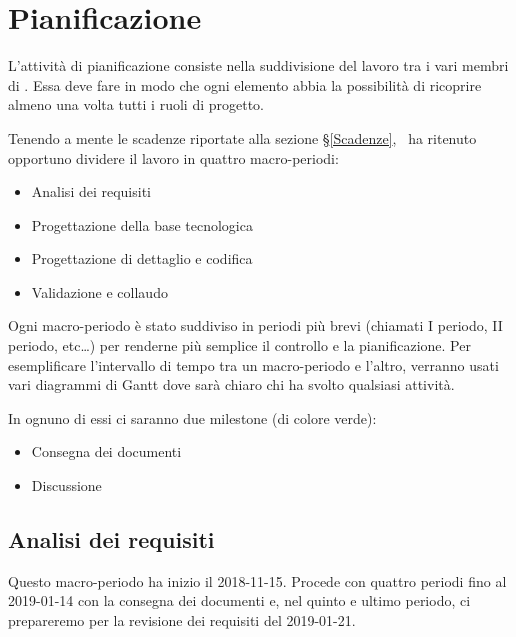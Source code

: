 \newpage
\section{Pianificazione}\label{Pianificazione}
	L'attività di pianificazione consiste nella suddivisione del lavoro tra i vari membri di \gruppo.
	Essa deve fare in modo che ogni elemento abbia la possibilità di ricoprire almeno una volta tutti i ruoli di progetto.

    Tenendo a mente le scadenze riportate alla sezione \S\ref{Scadenze}, \gruppo\ ha ritenuto opportuno dividere il lavoro in quattro macro-periodi:
	\begin{itemize}
	\item Analisi dei requisiti
	\item Progettazione della base tecnologica
	\item Progettazione di dettaglio e codifica
	\item Validazione e collaudo
	\end{itemize}

	Ogni macro-periodo è stato suddiviso in periodi più brevi (chiamati I periodo, II periodo, etc\dots) per renderne più semplice il
    controllo e la pianificazione. Per esemplificare l'intervallo di tempo tra un macro-periodo e l'altro, verranno usati vari
    diagrammi di Gantt dove sarà chiaro chi ha svolto qualsiasi attività.

    In ognuno di essi ci saranno due milestone (di colore verde):

    \begin{itemize}
    	\item Consegna dei documenti
    	\item Discussione
    \end{itemize}

    \subsection{Analisi dei requisiti}
        Questo macro-periodo ha inizio il 2018-11-15. Procede con quattro periodi fino al 2019-01-14 con la consegna dei documenti e, nel
        quinto e ultimo periodo, ci prepareremo per la revisione dei requisiti del 2019-01-21.

